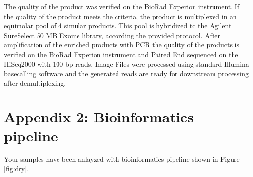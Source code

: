 \documentclass[a4paper,12pt]{article}
\begin{document}
The quality of the product was verified on the BioRad Experion instrument. If the quality of the product meets the criteria, the product is multiplexed in an equimolar pool of 4 simular products. This pool is hybridized to the Agilent SureSelect 50 MB Exome library, according the provided protocol. After amplification of the enriched products with PCR the quality of the products is verified on the BioRad Experion instrument and Paired End sequenced on the HiSeq2000 with 100 bp reads. Image Files were processed using standard Illumina basecalling software and the generated reads are ready for downstream processing after demultiplexing.

\clearpage
\section*{Appendix 2: Bioinformatics pipeline}
\begin{wrapfigure}{r}{0.5\textwidth}
	\begin{center}
		\texttt{[image: \$\{workflowpng]}}
	\end{center}
	\caption{Bioinformatics pipeline}
	\label{fig:dry}
\end{wrapfigure}
Your samples have been anlayzed with bioinformatics pipeline shown in Figure \ref{fig:dry}.
\end{document}
